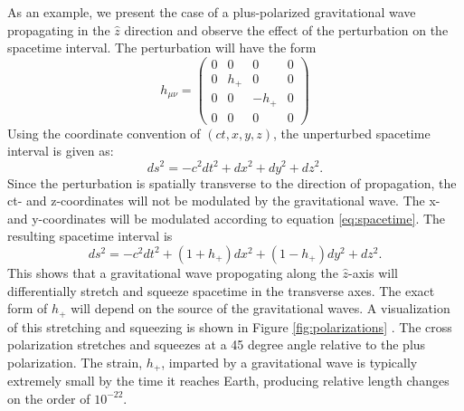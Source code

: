 As an example, we present the case of a plus-polarized gravitational wave 
propagating in the $\hat{z}$ direction and observe the effect of the perturbation 
on the spacetime interval. The perturbation will have the form 
\begin{equation}
h_{\mu\nu} = 
  \begin{pmatrix}
    0 & 0 & 0 & 0 \\
    0 & h_+ & 0 & 0 \\
    0 & 0 & -h_+ & 0 \\
    0 & 0 & 0 & 0
  \end{pmatrix}
\end{equation}
Using the coordinate convention of $(ct,x,y,z)$, the unperturbed
spacetime interval is given as: 
\begin{equation}
ds^2 = -c^2 dt^2 + dx^2 + dy^2 + dz^2.
\end{equation}
Since the perturbation is spatially transverse to the direction of 
propagation, the ct- and z-coordinates will not be modulated by the 
gravitational wave. The x- and y-coordinates will be modulated  
according to equation \ref{eq:spacetime}. The resulting spacetime 
interval is
\begin{equation}
ds^2 = -c^2 dt^2 + (1 + h_+)dx^2 + (1 - h_+)dy^2 + dz^2.
\end{equation}
This shows that a gravitational wave propogating along the $\hat{z}$-axis 
will differentially stretch and squeeze spacetime in the transverse 
axes. The exact form of $h_+$ will depend on the source of the 
gravitational waves. A visualization of this stretching and squeezing 
is shown in Figure \ref{fig:polarizations} \cite{Polarization}. The cross polarization  
stretches and squeezes at a 45 degree angle relative to the plus 
polarization. The strain, $h_+$, imparted by a gravitational wave is 
typically extremely small by the time it reaches Earth, producing 
relative length changes on the order of $10^{-22}$. 

